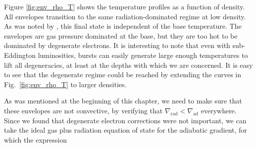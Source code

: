 \documentclass[../main.tex]{subfiles}
\begin{document}
Figure \ref{fig:env_rho_T} shows the temperature profiles as a function of density. All envelopes transition to the same radiation-dominated regime at low density. As was noted by \citet{Paczynski1986a}, this final state is independent of the base temperature. The envelopes are gas pressure dominated at the base, but they are too hot to be dominated by degenerate electrons. It is interesting to note that even with sub-Eddington luminosities, bursts can easily generate large enough temperatures to lift all degeneracies, at least at the depths with which we are concerned. It is easy to see that the degenerate regime could be reached by extending the curves in Fig.~\ref{fig:env_rho_T} to larger densities. 

As was mentioned at the beginning of this chapter, we need to make sure that these envelopes are not convective, by verifying that $\nabla_\text{rad}<\nabla_\text{ad}$ everywhere. Since we found that degenerate electron corrections were not important, we can take the ideal gas plus radiation equation of state for the adiabatic gradient, for which the expression
\end{document}
